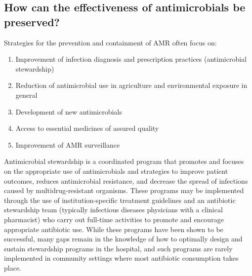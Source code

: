 \documentclass[
]{book}
\providecommand{\tightlist}{%
  \setlength{\itemsep}{0pt}\setlength{\parskip}{0pt}}
\begin{document}
\hypertarget{how-can-the-effectiveness-of-antimicrobials-be-preserved}{%
\subsection*{How can the effectiveness of antimicrobials be preserved?}\label{how-can-the-effectiveness-of-antimicrobials-be-preserved}}

Strategies for the prevention and containment of AMR often focus on:

\begin{enumerate}
\def\labelenumi{\arabic{enumi}.}
\tightlist
\item
  Improvement of infection diagnosis and prescription practices (antimicrobial stewardship)
\item
  Reduction of antimicrobial use in agriculture and environmental exposure in general
\item
  Development of new antimicrobials
\item
  Access to essential medicines of assured quality
\item
  Improvement of AMR surveillance
\end{enumerate}

Antimicrobial stewardship is a coordinated program that promotes and focuses on the appropriate use of antimicrobials and strategies to improve patient outcomes, reduces antimicrobial resistance, and decrease the spread of infections caused by multidrug-resistant organisms. These programs may be implemented through the use of institution-specific treatment guidelines and an antibiotic stewardship team (typically infectious diseases physicians with a clinical pharmacist) who carry out full-time activities to promote and encourage appropriate antibiotic use. While these programs have been shown to be successful, many gaps remain in the knowledge of how to optimally design and sustain stewardship programs in the hospital, and such programs are rarely implemented in community settings where most antibiotic consumption takes place.
\end{document}
